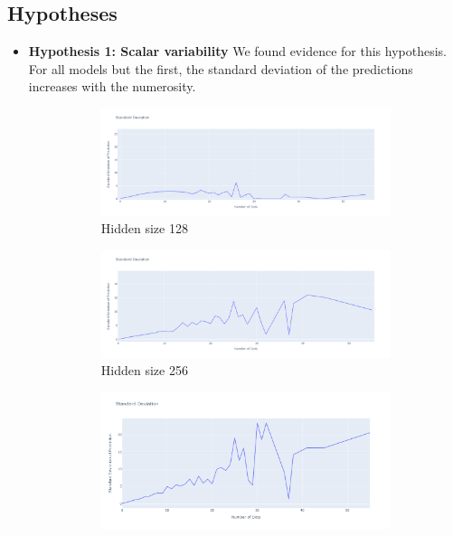 \documentclass{article}
\begin{document}
\subsection{Hypotheses}
\begin{itemize}

    \item \textbf{Hypothesis 1: Scalar variability}\newline
    We found evidence for this hypothesis. For all models but the first, the standard deviation of the predictions increases with the numerosity. 
        \begin{figure}[H]
  \begin{subfigure}{0.3\textwidth}
    \centering
    \includegraphics[width=.8\linewidth]{template/fourthx_std.png}
    \caption{Hidden size 128}
    \label{fig:6a}
  \end{subfigure}
  \begin{subfigure}{0.3\textwidth}\quad
    \centering
    \includegraphics[width=.8\linewidth]{template/1x_std.png}
    \caption{Hidden size 256}
    \label{fig:3a}
  \end{subfigure}
  \begin{subfigure}{0.3\textwidth}\quad
    \centering
    \includegraphics[width=.8\linewidth]{template/10x_std.png}

\end{subfigure}
\end{figure}
\end{itemize}
\end{document}
